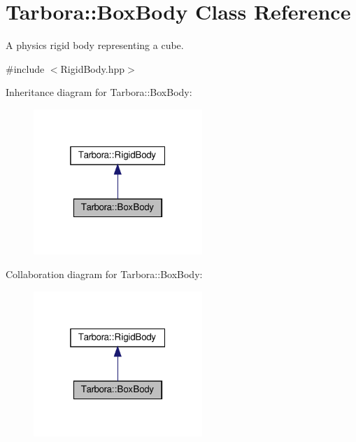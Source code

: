 \hypertarget{classTarbora_1_1BoxBody}{}\section{Tarbora\+:\+:Box\+Body Class Reference}
\label{classTarbora_1_1BoxBody}


A physics rigid body representing a cube.  




{\ttfamily \#include $<$Rigid\+Body.\+hpp$>$}



Inheritance diagram for Tarbora\+:\+:Box\+Body\+:\nopagebreak
\begin{figure}[H]
\begin{center}
\leavevmode
\includegraphics[width=181pt]{classTarbora_1_1BoxBody__inherit__graph}
\end{center}
\end{figure}


Collaboration diagram for Tarbora\+:\+:Box\+Body\+:\nopagebreak
\begin{figure}[H]
\begin{center}
\leavevmode
\includegraphics[width=181pt]{classTarbora_1_1BoxBody__coll__graph}
\end{center}
\end{figure}
